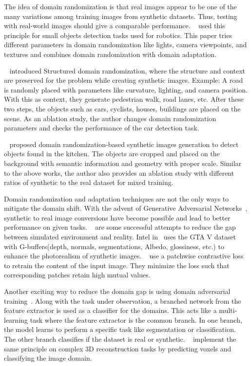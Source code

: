 The idea of domain randomization is that real images appear to be one of the many variations among training images from synthetic datasets.
Thus, testing with real-world images should give a comparable performance.
~\cite{tobin2017domain} used this principle for small objects detection tasks used for robotics.
This paper tries different parameters in domain randomization like lights, camera viewpoints, and textures and combines domain randomization with domain adaptation.

~\cite{prakash2020structured} introduced Structured domain randomization, where the structure and context are preserved for the problem while creating synthetic images.
Example: A road is randomly placed with parameters like curvature, lighting, and camera position.
With this as context, they generate pedestrian walk, road lanes, etc.
After these two steps, the objects such as cars, cyclists, houses, buildings are placed on the scene.
As an ablation study, the author changes domain randomization parameters and checks the performance of the car detection task.

~\cite{georgakis2017synthesizing} proposed domain randomization-based synthetic images generation to detect objects found in the kitchen.
The objects are cropped and placed on the background with semantic information and geometry with proper scale.
Similar to the above works, the author also provides an ablation study with different ratios of synthetic to the real dataset for mixed training.

Domain randomization and adaptation techniques are not the only ways to mitigate the domain shift.
With the advent of Generative Adversarial Networks~\cite{Goodfellow2014GenerativeAN}, synthetic to real image conversions have become possible and lead to better performance on given tasks.
~\cite{Richter_2021, CycleGAN2017, park2020cut,isola2017image, dundar2018domain,Wang2018HighResolutionIS} are some successful attempts to reduce the gap between simulated environment and reality.
Intel in~\cite{Richter_2021} uses the GTA V dataset with G-buffers(depth, normals, segmentations, Albedo, glossiness, etc.) to enhance the photorealism of synthetic images.
~\cite{park2020cut} use a patchwise contrastive loss to retrain the content of the input image.
They minimize the loss such that corresponding patches retain high mutual values.

Another exciting way to reduce the domain gap is using domain adversarial training~\cite{ganin2016domainadversarial}.
Along with the task under observation, a branched network from the feature extractor is used as a classifier for the domains.
This acts like a multi-learning task where the feature extractor is the common branch.
In one branch, the model learns to perform a specific task like segmentation or classification.
The other branch classifies if the dataset is real or synthetic.
~\cite{pinheiro2019domainadaptive} implement the same principle on complex 3D reconstruction tasks by predicting voxels and classifying the image domain.

